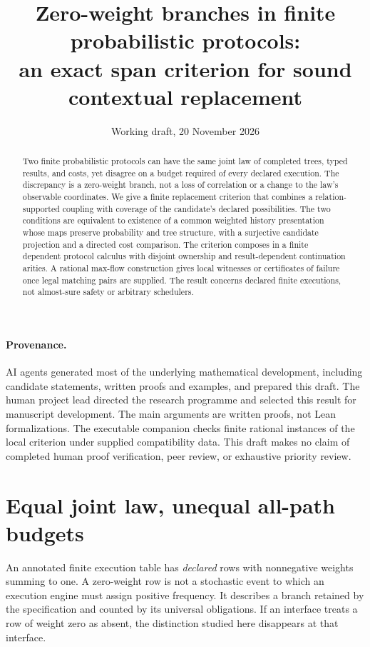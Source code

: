 \documentclass[11pt]{article}
\title{Zero-weight branches in finite probabilistic protocols:\\
  an exact span criterion for sound contextual replacement}
\author{}
\date{Working draft, 20 November 2026}
\theoremstyle{definition}
\begin{document}
\maketitle
\begin{abstract}
Two finite probabilistic protocols can have the same joint law of completed
trees, typed results, and costs, yet disagree on a budget required of every
declared execution. The discrepancy is a zero-weight branch, not a loss of
correlation or a change to the law's observable coordinates. We give a
finite replacement criterion that combines a relation-supported coupling
with coverage of the candidate's declared possibilities. The two conditions
are equivalent to existence of a common weighted history presentation whose
maps preserve probability and tree structure, with a surjective candidate
projection and a directed cost comparison. The criterion composes in a
finite dependent protocol calculus with disjoint ownership and result-dependent
continuation arities. A rational max-flow construction gives local witnesses
or certificates of failure once legal matching pairs are supplied.
The result concerns declared finite executions, not almost-sure safety or
arbitrary schedulers.
\end{abstract}

\paragraph{Provenance.}
AI agents generated most of the underlying mathematical development,
including candidate statements, written proofs and examples, and prepared
this draft. The human project lead directed the research programme and
selected this result for manuscript development. The main arguments are
written proofs, not Lean formalizations. The executable companion checks
finite rational instances of the local criterion under supplied compatibility
data. This draft makes no claim of completed human proof verification,
peer review, or exhaustive priority review.

\section{Equal joint law, unequal all-path budgets}

An annotated finite execution table has \emph{declared} rows with
nonnegative weights summing to one. A zero-weight row is not a stochastic
event to which an execution engine must assign positive frequency. It
describes a branch retained by the specification and counted by its
universal obligations. If an interface treats a row of weight zero as
absent, the distinction studied here disappears at that interface.
\end{document}
